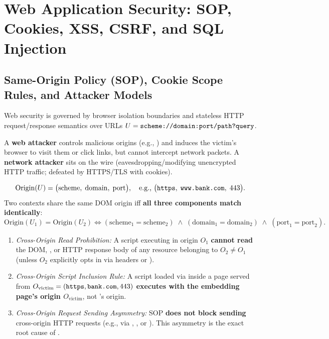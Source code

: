 \section{Web Application Security: SOP, Cookies, XSS, CSRF, and SQL Injection}

\subsection{Same-Origin Policy (SOP), Cookie Scope Rules, and Attacker Models}
Web security is governed by browser isolation boundaries and stateless HTTP request/response semantics over URLs $U = \texttt{scheme://domain:port/path?query}$.
\begin{compactitem}
  \item {} A \textbf{web attacker} controls malicious origins (e.g., ) and induces the victim's browser to visit them or click links, but cannot intercept network packets. A \textbf{network attacker} sits on the wire (eavesdropping/modifying unencrypted HTTP traffic; defeated by HTTPS/TLS with  cookies).
  \item {}
  \[
    \mathrm{Origin}(U) = \big(\mathrm{scheme},\; \mathrm{domain},\; \mathrm{port}\big), \quad \text{e.g., } \big(\texttt{https},\; \texttt{www.bank.com},\; 443\big).
  \]
  Two contexts share the same DOM origin iff \textbf{all three components match identically}:
  \[
    \mathrm{Origin}(U_1) = \mathrm{Origin}(U_2) \iff (\mathrm{scheme}_1 = \mathrm{scheme}_2) \;\land\; (\mathrm{domain}_1 = \mathrm{domain}_2) \;\land\; (\mathrm{port}_1 = \mathrm{port}_2).
  \]
  \item {}
  \begin{enumerate}[label=\arabic*., leftmargin=1.5em]
    \item \emph{Cross-Origin Read Prohibition:} A script executing in origin $O_1$ \textbf{cannot read} the DOM, , or HTTP response body of any resource belonging to $O_2 \neq O_1$ (unless $O_2$ explicitly opts in via  headers or ).
    \item \emph{Cross-Origin Script Inclusion Rule:} A script loaded via  inside a page served from $O_{\text{victim}} = (\texttt{https}, \texttt{bank.com}, 443)$ \textbf{executes with the embedding page's origin $O_{\text{victim}}$}, not 's origin.
    \item \emph{Cross-Origin Request Sending Asymmetry:} SOP \textbf{does not block sending} cross-origin HTTP requests (e.g., via , , or ). This asymmetry is the exact root cause of .
  \end{enumerate}
\end{compactitem}


